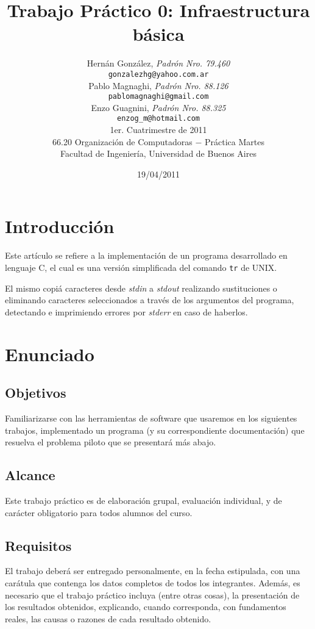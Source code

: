 \documentclass[a4paper,10pt]{article}
\title{		\textbf{Trabajo Pr\'{a}ctico 0: Infraestructura b\'{a}sica}}
\author{	Hern\'{a}n Gonz\'{a}lez, \textit{Padr\'{o}n Nro. 79.460}		\\
            \texttt{ gonzalezhg@yahoo.com.ar }						\\[2.5ex]
            Pablo Magnaghi, \textit{Padr\'{o}n Nro. 88.126}				\\
            \texttt{ pablomagnaghi@gmail.com }						\\[2.5ex]
            Enzo Guagnini, \textit{Padr\'{o}n Nro. 88.325}				\\
            \texttt{ enzog\_m@hotmail.com }						\\[2.5ex]
            \normalsize{1er. Cuatrimestre de 2011}					\\
            \normalsize{66.20 Organizaci\'{o}n de Computadoras  $-$ Pr\'{a}ctica Martes}\\
            \normalsize{Facultad de Ingenier\'{i}a, Universidad de Buenos Aires}	\\
       }
\date{19/04/2011}
\begin{document}
\maketitle

\thispagestyle{empty}

\newpage
\newpage

\section{Introducci\'{o}n}
Este art\'{i}culo se refiere a la implementaci\'{o}n de un programa desarrollado en lenguaje C, el cual es una versi\'{o}n simplificada del comando \texttt{tr} de UNIX.

El mismo copi\'{a} caracteres desde \textit{stdin} a \textit{stdout} realizando sustituciones o eliminando caracteres seleccionados a trav\'{e}s de los argumentos del programa, detectando e imprimiendo errores por \textit{stderr} en caso de haberlos.

\section{Enunciado}

\subsection{Objetivos}
Familiarizarse con las herramientas de software que usaremos en los siguientes  trabajos, implementado un programa (y su correspondiente documentaci\'{o}n) que resuelva el problema piloto que se presentar\'{a} m\'{a}s abajo.
	
\subsection{Alcance}
Este trabajo pr\'{a}ctico es de elaboraci\'{o}n grupal, evaluaci\'{o}n individual, y de car\'{a}cter obligatorio para todos alumnos del curso.

\subsection{Requisitos}
El trabajo deber\'{a} ser entregado personalmente, en la fecha estipulada, con una  car\'{a}tula que contenga los datos completos de todos los integrantes. Adem\'{a}s, es necesario que el trabajo pr\'{a}ctico incluya (entre otras cosas), la presentaci\'{o}n de los resultados obtenidos, explicando, cuando corresponda, con fundamentos reales, las causas o razones de cada resultado obtenido.
\end{document}
